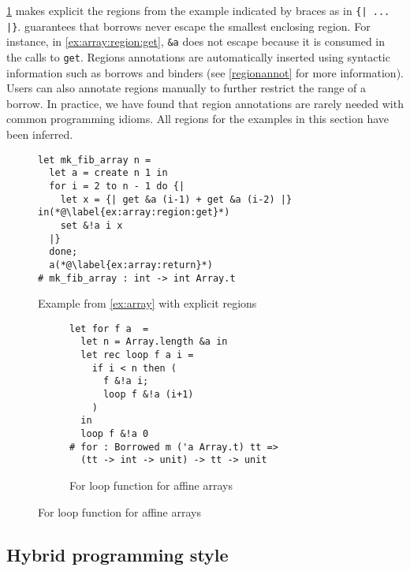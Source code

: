 \cref{ex:array:region} makes explicit the regions from the example
indicated by braces as in \lstinline/{| ... |}/.  \lang guarantees that borrows
never escape the smallest enclosing region.  For instance, in
\cref{ex:array:region:get}, \lstinline/&a/ does not escape because it
is consumed in the calls to \lstinline/get/.
Regions annotations are automatically inserted using
syntactic information such as borrows and binders (see
\cref{regionannot} for more information).  Users can also
annotate regions manually to further restrict the range of a
borrow. In practice, we have found that region annotations are
rarely needed with common programming idioms. All regions for the
examples in this section have been inferred.


\begin{figure}
  \centering
\begin{lstlisting}
let mk_fib_array n =
  let a = create n 1 in
  for i = 2 to n - 1 do {|
    let x = {| get &a (i-1) + get &a (i-2) |} in(*@\label{ex:array:region:get}*)
    set &!a i x
  |}
  done;
  a(*@\label{ex:array:return}*)
# mk_fib_array : int -> int Array.t
\end{lstlisting}
    \caption{Example from \cref{ex:array} with explicit regions}
    \label{ex:array:region}
\end{figure}



\begin{figure}
  \centering
  \begin{subfigure}{0.5\linewidth}
\begin{lstlisting}
let for f a  = 
  let n = Array.length &a in
  let rec loop f a i = 
    if i < n then (
      f &!a i;
      loop f &!a (i+1)
    )
  in
  loop f &!a 0
# for : Borrowed m ('a Array.t) tt =>
  (tt -> int -> unit) -> tt -> unit
\end{lstlisting}
    \caption{For loop function for affine arrays}
    \label{ex:array:for}
  \end{subfigure}
\end{figure}

\subsection{Hybrid programming style}

